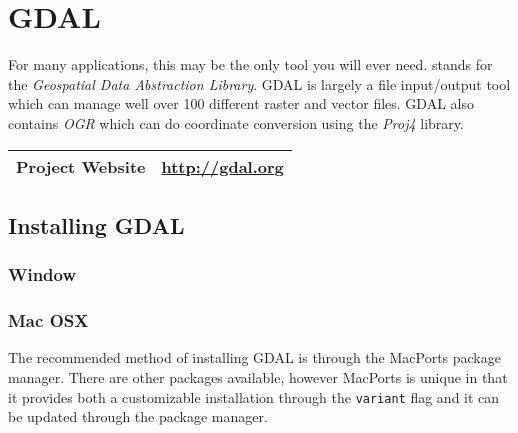 %


\section*{GDAL}

For many applications, this may be the only tool you will ever need.  
stands for the \emph{Geospatial Data Abstraction Library}.  GDAL is largely 
a file input/output tool which can manage well over 100 different raster and vector
files.  GDAL also contains \emph{OGR} which can do coordinate conversion
using the \emph{Proj4} library.


\begin{table}[h!]
\begin{tabular}{l c}\hline
Project Website & \url{http://gdal.org} \\\hline
\end{tabular}
\end{table}


\subsection*{Installing GDAL}


\subsubsection*{Window}



\subsubsection*{Mac OSX}

The recommended method of installing GDAL is through the MacPorts package manager.
There are other packages available, however MacPorts is unique in that it provides both a customizable
installation through the \texttt{variant} flag and it can be updated through
the package manager.


